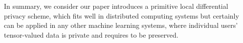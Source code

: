 In summary, we consider our paper introduces a primitive local differential privacy scheme, which fits well in distributed computing systems but certainly can be applied in any other machine learning systems, where individual users' tensor-valued data is private and requires to be preserved.
